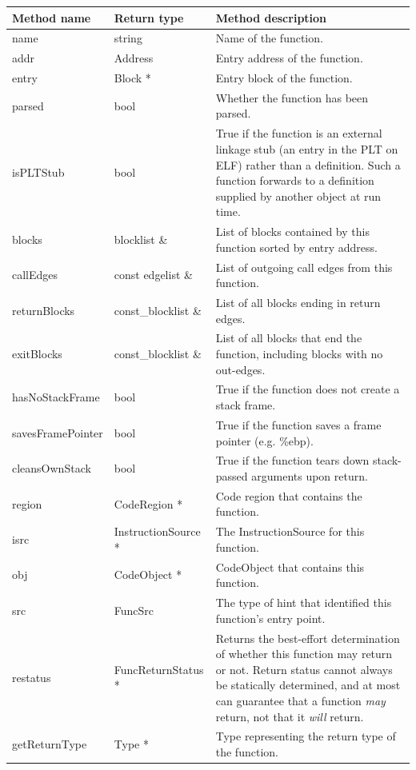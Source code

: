 \begin{tabularx}{\textwidth}{llX}
\toprule
Method name & Return type & Method description \\
\midrule
name & string & Name of the function. \\
addr & Address & Entry address of the function.  \\
entry & Block * & Entry block of the function. \\
parsed & bool & Whether the function has been parsed. \\
isPLTStub & bool & True if the function is an external linkage stub (an entry in the PLT on ELF) rather than a definition. Such a function forwards to a definition supplied by another object at run time. \\
blocks & blocklist \& & List of blocks contained by this function sorted by entry address. \\
callEdges & const edgelist \& & List of outgoing call edges from this function. \\
returnBlocks & const\_blocklist \& & List of all blocks ending in return edges. \\
exitBlocks & const\_blocklist \& & List of all blocks that end the function, including blocks with no out-edges. \\
hasNoStackFrame & bool & True if the function does not create a stack frame. \\
savesFramePointer & bool & True if the function saves a frame pointer (e.g. \%ebp). \\
cleansOwnStack & bool & True if the function tears down stack-passed arguments upon return. \\
region & CodeRegion * & Code region that contains the function. \\
isrc & InstructionSource * & The InstructionSource for this function. \\
obj & CodeObject * & CodeObject that contains this function. \\
src & FuncSrc & The type of hint that identified this function's entry point. \\
restatus & FuncReturnStatus * & Returns the best-effort determination of whether this function may return or not. Return status cannot always be statically determined, and at most can guarantee that a function \emph{may} return, not that it \emph{will} return. \\
getReturnType & Type * & Type representing the return type of the function. \\

\bottomrule
\end{tabularx}

